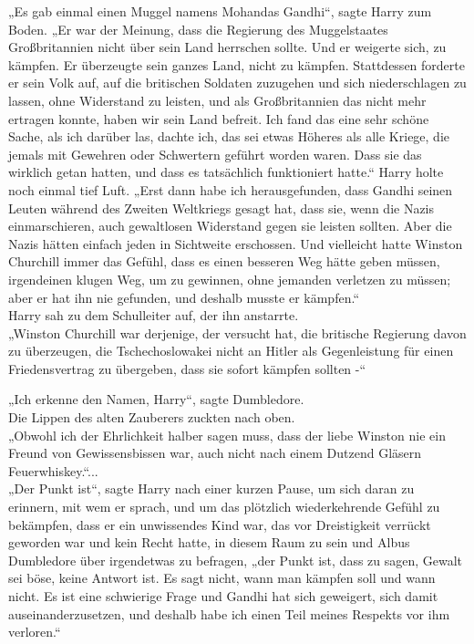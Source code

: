 {„Es gab einmal einen Muggel namens Mohandas Gandhi“, sagte Harry zum Boden. „Er war der Meinung, dass die Regierung des Muggelstaates Großbritannien nicht über sein Land herrschen sollte. Und er weigerte sich, zu kämpfen. Er überzeugte sein ganzes Land, nicht zu kämpfen. Stattdessen forderte er sein Volk auf, auf die britischen Soldaten zuzugehen und sich niederschlagen zu lassen, ohne Widerstand zu leisten, und als Großbritannien das nicht mehr ertragen konnte, haben wir sein Land befreit. Ich fand das eine sehr schöne Sache, als ich darüber las, dachte ich, das sei etwas Höheres als alle Kriege, die jemals mit Gewehren oder Schwertern geführt worden waren. Dass sie das wirklich getan hatten, und dass es tatsächlich funktioniert hatte.“ Harry holte noch einmal tief Luft. „Erst dann habe ich herausgefunden, dass Gandhi seinen Leuten während des Zweiten Weltkriegs gesagt hat, dass sie, wenn die Nazis einmarschieren, auch gewaltlosen Widerstand gegen sie leisten sollten. Aber die Nazis hätten einfach jeden in Sichtweite erschossen. Und vielleicht hatte Winston Churchill immer das Gefühl, dass es einen besseren Weg hätte geben müssen, irgendeinen klugen Weg, um zu gewinnen, ohne jemanden verletzen zu müssen; aber er hat ihn nie gefunden, und deshalb musste er kämpfen.“\\ Harry sah zu dem Schulleiter auf, der ihn anstarrte.\\ „Winston Churchill war derjenige, der versucht hat, die britische Regierung davon zu überzeugen, die Tschechoslowakei nicht an Hitler als Gegenleistung für einen Friedensvertrag zu übergeben, dass sie sofort kämpfen sollten -“

„Ich erkenne den Namen, Harry“, sagte Dumbledore.\\ Die Lippen des alten Zauberers zuckten nach oben.\\ „Obwohl ich der Ehrlichkeit halber sagen muss, dass der liebe Winston nie ein Freund von Gewissensbissen war, auch nicht nach einem Dutzend Gläsern Feuerwhiskey.“...\\ „Der Punkt ist“, sagte Harry nach einer kurzen Pause, um sich daran zu erinnern, mit wem er sprach, und um das plötzlich wiederkehrende Gefühl zu bekämpfen, dass er ein unwissendes Kind war, das vor Dreistigkeit verrückt geworden war und kein Recht hatte, in diesem Raum zu sein und Albus Dumbledore über irgendetwas zu befragen, „der Punkt ist, dass zu sagen, Gewalt sei böse, keine Antwort ist. Es sagt nicht, wann man kämpfen soll und wann nicht. Es ist eine schwierige Frage und Gandhi hat sich geweigert, sich damit auseinanderzusetzen, und deshalb habe ich einen Teil meines Respekts vor ihm verloren.“

}
